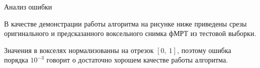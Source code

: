 \documentclass[9pt,pdf]{beamer} %
\begin{document}
\begin{frame}{Анализ ошибки}

В качестве демонстрации работы алгоритма на рисунке ниже приведены срезы оригинального и предсказанного воксельного снимка фМРТ из тестовой выборки. 
\begin{figure}[h!]
    \centering
    \hfill
    \hfill
    \label{fig:5}
\end{figure}
Значения в вокселях нормализованны на отрезок $[0,~1]$, поэтому ошибка порядка $10^{-3}$ говорит о достаточно хорошем качестве работы алгоритма.

\end{frame}
\end{document}
